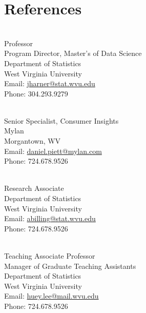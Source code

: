 \documentclass[letterpaper]{deedy-resume} %
\begin{document}

\lastupdated %


\section{References}
\vspace{10pt}
\begin{flushleft}
\\
Professor\\
Program Director, Master's of Data Science\\
Department of Statistics\\
West Virginia University\\
Email: \href{mailto:jharner@stat.wvu.edu}{jharner@stat.wvu.edu}\\
Phone: 304.293.9279\\
\vspace{30pt}

\\
Senior Specialist, Consumer Insights\\
Mylan\\
Morgantown, WV\\
Email: \href{mailto:daniel.piett@mylan.com}{daniel.piett@mylan.com}\\
Phone: 724.678.9526\\
\vspace{30pt}

\\
Research Associate\\
Department of Statistics\\
West Virginia University\\
Email: \href{mailto:abilling@stat.wvu.edu}{abilling@stat.wvu.edu}\\
Phone: 724.678.9526\\
\vspace{30pt}

\\
Teaching Associate Professor\\
Manager of Graduate Teaching Assistants\\
Department of Statistics\\
West Virginia University\\
Email: \href{mailto:huey.lee@mail.wvu.edu}{huey.lee@mail.wvu.edu}\\
Phone: 724.678.9526\\
\vspace{30pt}


\end{flushleft}
\end{document}
